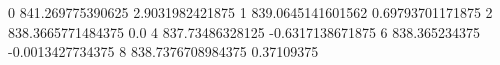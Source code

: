 0 841.269775390625 2.9031982421875
1 839.0645141601562 0.69793701171875
2 838.3665771484375 0.0
4 837.73486328125 -0.6317138671875
6 838.365234375 -0.0013427734375
8 838.7376708984375 0.37109375
